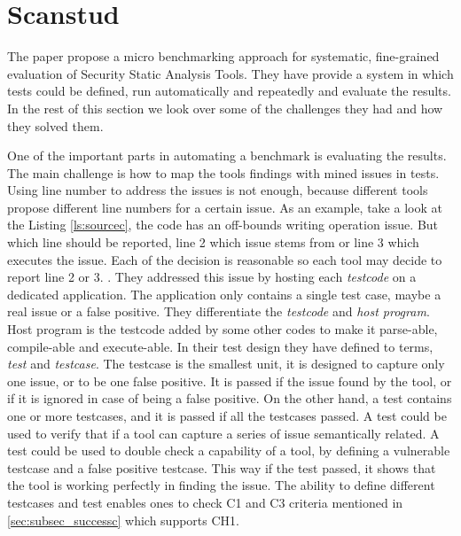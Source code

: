 \documentclass[authoryear,preprint]{sigplanconf}
\begin{document}
\section{Scanstud}
\label{sec:sec_scanstud}
The paper propose a micro benchmarking approach for systematic, fine-grained evaluation of Security Static Analysis Tools. They have provide a system in which tests could be defined, run automatically and repeatedly and evaluate the results. 
In the rest of this section we look over some of the challenges they had and how they solved them. 

One of the important parts in automating a benchmark is evaluating the results. The main challenge is how to map the tools findings with mined issues in tests. Using line number to address the issues is not enough, because different tools propose different line numbers for a certain issue. As an example, take a look at the Listing \ref{ls:sourcec}, the code has an off-bounds writing operation issue. But which line should be reported, line 2 which issue stems from or line 3 which executes the issue. Each of the decision is reasonable so each tool may decide to report line 2 or 3. . They addressed this issue by hosting each \textit{testcode} on a dedicated application. The application only contains a single test case, maybe a real issue or a false positive. They differentiate the \textit{testcode} and \textit{host program}. Host program is the testcode added by some other codes to make it parse-able, compile-able and execute-able. In their test design they have defined to terms, \textit{test} and \textit{testcase}. The testcase is the smallest unit, it is designed to capture only one issue, or to be one false positive. It is passed if the issue found by the tool, or if it is ignored in case of being a false positive. On the other hand, a test contains one or more testcases, and it is passed if all the testcases passed. A test could be used to verify that if a tool can capture a series of issue semantically related. A test could be used to double check a capability of a tool, by defining a vulnerable testcase and a false positive testcase. This way if the test passed, it shows that the tool is working perfectly in finding the issue. The ability to define different testcases and test enables ones to check C1 and C3 criteria mentioned in \ref{sec:subsec_successc} which supports CH1.

\lstset{numbers=left, numberstyle=\tiny, stepnumber=1, numbersep=5pt}
\lstset{basicstyle=\ttfamily}
\lstset{frame=tb}
\lstset{basicstyle=\tiny}
\end{document}
